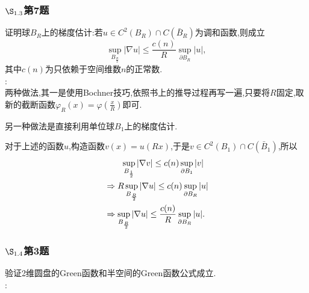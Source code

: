\documentclass[12pt, a4paper]{article}
\begin{document}
	\subsubsection{$\S_{1.3}$第7题}
	\kaishu{}证明球$B_R$上的梯度估计:若$u \in C^2(B_R) \cap C(\bar{B}_R)$为调和函数,则成立$$
	\sup_{B_{\frac{R}{2}}} |\nabla u| \le \frac{c(n)}{R} \sup_{\partial B_R}|u|,	$$
	其中$c(n)$为只依赖于空间维数$n$的正常数.\\
	
	\songti{}:\\
	
	两种做法,其一是使用Bochner技巧,依照书上的推导过程再写一遍,只要将$R$固定,取新的截断函数$\varphi_R(x)=\varphi\left(\frac{x}{R} \right)$即可.
	
	另一种做法是直接利用单位球$B_1$上的梯度估计.
	
	对于上述的函数$u$,构造函数$v(x)=u(Rx)$,于是$v \in C^2(B_1) \cap C(\bar{B}_1)$,所以
	\begin{align}
	&\qquad \sup_{B_{\frac{1}{2}}} |\nabla v| \le c(n) \sup_{\partial B_1}|v| \notag \\
	&\Rightarrow R \sup_{B_{\frac{R}{2}}} |\nabla u| \le c(n) \sup_{\partial B_R}|u| \notag \\
	&\Rightarrow \sup_{B_{\frac{R}{2}}} |\nabla u| \le \frac{c(n)}{R} \sup_{\partial B_R}|u| \notag.
	\end{align}
	
	\subsubsection{$\S_{1.4}$第3题}
	\kaishu{}验证2维圆盘的Green函数和半空间的Green函数公式成立.\\
	
	\songti{}:
	
\end{document}
